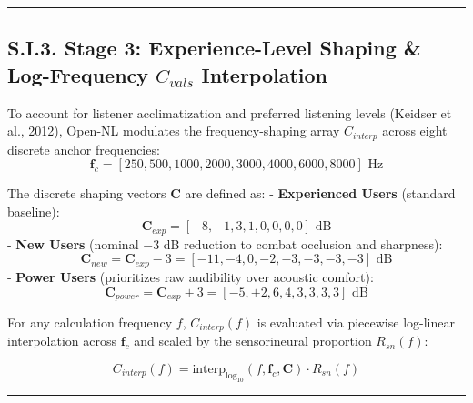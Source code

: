 \documentclass[
  12pt,
]{article}
\begin{document}
\begin{center}\rule{0.5\linewidth}{0.5pt}\end{center}

\subsection{\texorpdfstring{S.I.3. Stage 3: Experience-Level Shaping \&
Log-Frequency \(C_{vals}\)
Interpolation}{S.I.3. Stage 3: Experience-Level Shaping \& Log-Frequency C\_\{vals\} Interpolation}}\label{s.i.3.-stage-3-experience-level-shaping-log-frequency-c_vals-interpolation}

To account for listener acclimatization and preferred listening levels
(Keidser et al., 2012), Open-NL modulates the frequency-shaping array
\(C_{interp}\) across eight discrete anchor frequencies:
\begin{equation}
\mathbf{f}_c = [250, 500, 1000, 2000, 3000, 4000, 6000, 8000]\text{ Hz}
\end{equation}

The discrete shaping vectors \(\mathbf{C}\) are defined as: -
\textbf{Experienced Users} (standard baseline): \begin{equation}
  \mathbf{C}_{exp} = [-8, -1, 3, 1, 0, 0, 0, 0]\text{ dB}
  \end{equation} - \textbf{New Users} (nominal \(-3\) dB reduction to
combat occlusion and sharpness): \begin{equation}
  \mathbf{C}_{new} = \mathbf{C}_{exp} - 3 = [-11, -4, 0, -2, -3, -3, -3, -3]\text{ dB}
  \end{equation} - \textbf{Power Users} (prioritizes raw audibility over
acoustic comfort): \begin{equation}
  \mathbf{C}_{power} = \mathbf{C}_{exp} + 3 = [-5, +2, 6, 4, 3, 3, 3, 3]\text{ dB}
  \end{equation}

For any calculation frequency \(f\), \(C_{interp}(f)\) is evaluated via
piecewise log-linear interpolation across \(\mathbf{f}_c\) and scaled by
the sensorineural proportion \(R_{sn}(f)\):

\begin{equation}
C_{interp}(f) = \text{interp}_{\log_{10}}\left(f, \mathbf{f}_c, \mathbf{C}\right) \cdot R_{sn}(f)
\end{equation}

\begin{center}\rule{0.5\linewidth}{0.5pt}\end{center}
\end{document}
